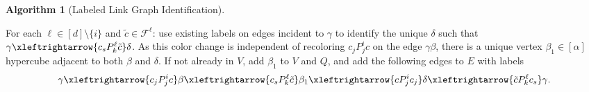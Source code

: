 \documentclass{amsart}
\theoremstyle{hypothesisstyle}
\theoremstyle{definition}
\newtheorem{algorithm}[alg]{Algorithm}
\theoremstyle{remark}
\numberwithin{equation}{section}
\begin{document}
\begin{algorithm}[Labeled Link Graph Identification]
\begin{enumerate}
\begin{itemize}
For each $\ell\in[d]\setminus\{i\}$ and $\tilde{c}\in\mathcal{F}^\ell$: use existing labels on edges incident to $\gamma$ to identify the unique $\delta$ such that $\gamma \xleftrightarrow{c_sP^\ell_{k}\tilde{c}}  \delta$. As this color change is independent of recoloring $c_jP^i_jc$ on the edge $\gamma\beta$, there is a unique vertex $\beta_1\in[\alpha]$ hypercube adjacent to both $\beta$ and $\delta$.  If not already in $V$, add $\beta_1$ to $V$ and $Q$, and add the following edges to $E$ with labels
\[\gamma \xleftrightarrow{c_jP^i_{j}c}  \beta\xleftrightarrow{c_sP^\ell_{k}\tilde{c}} \beta_1\xleftrightarrow{cP^i_{j}c_j}\delta\xleftrightarrow{\tilde{c}P^\ell_{k}c_s}  \gamma.
\]
\end{itemize}
\end{enumerate}
\end{algorithm}
\end{document}

